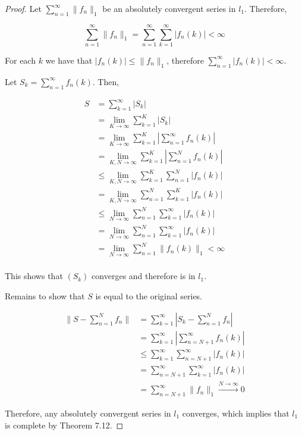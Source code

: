 \begin{proof}
Let $\sum_{n=1}^\infty \|f_n\|_1$ be an absolutely convergent series in $l_1$. Therefore, 

$$\sum_{n=1}^\infty \|f_n\|_1 = \sum_{n=1}^\infty \sum_{k=1}^\infty |f_n(k)| < \infty$$


For each $k$ we have that $|f_n(k)| \leq \|f_n\|_1$, therefore $\sum_{n=1}^\infty|f_n(k)| < \infty$.


Let $S_k = \sum_{n=1}^\infty f_n(k)$. Then,

\begin{align*}
    S &= \sum_{k=1}^\infty |S_k| \\
      &= \lim_{K\rightarrow \infty} \sum_{k=1}^K |S_k| \\
      &= \lim_{K\rightarrow \infty} \sum_{k=1}^K |\sum_{n=1}^\infty f_n(k)| \\
      &= \lim_{K,N\rightarrow \infty} \sum_{k=1}^K |\sum_{n=1}^N f_n(k)| \\
      &\leq \lim_{K,N\rightarrow \infty} \sum_{k=1}^K \sum_{n=1}^N |f_n(k)| \\
      &= \lim_{K,N\rightarrow \infty} \sum_{n=1}^N \sum_{k=1}^K  |f_n(k)| \\
      &\leq \lim_{N\rightarrow \infty} \sum_{n=1}^N \sum_{k=1}^\infty  |f_n(k)| \\
      &= \lim_{N\rightarrow \infty} \sum_{n=1}^N \sum_{k=1}^\infty  |f_n(k)| \\
      &= \lim_{N\rightarrow \infty} \sum_{n=1}^N \|f_n(k)\|_1 < \infty \\
\end{align*}

This shows that $(S_k)$ converges and therefore is in $l_1$. 

Remains to show that $S$ is equal to the original series. 

\begin{align*}
    \|S - \sum_{n=1}^N f_n\| &= \sum_{k=1}^\infty |S_k - \sum_{n=1}^N f_n| \\
    &= \sum_{k=1}^\infty | \sum_{n=N+1}^\infty f_n(k) | \\
    &\leq \sum_{k=1}^\infty \sum_{n=N+1}^\infty |f_n(k)| \\
    &=\sum_{n=N+1}^\infty \sum_{k=1}^\infty |f_n(k)| \\
    &= \sum_{n=N+1}^\infty \|f_n\|_1   \xrightarrow{N\rightarrow\infty} 0
\end{align*}

Therefore, any absolutely convergent series in $l_1$ converges, which implies that $l_1$ is complete by Theorem 7.12.


\end{proof}


